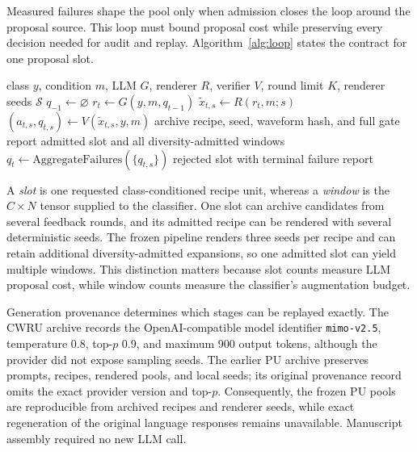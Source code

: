 \documentclass[a4paper,fleqn]{cas-sc}
\newcommand{\breeze}{BREEZE}
\begin{document}
Measured failures shape the pool only when admission closes the loop around the
proposal source. This loop must bound proposal cost while preserving every
decision needed for audit and replay. Algorithm~\ref{alg:loop} states the
contract for one proposal slot.

\begin{algorithm}[t]
\caption{\breeze\ recipe admission for one proposal slot}
\label{alg:loop}
\begin{algorithmic}[1]
\Require class $y$, condition $m$, LLM $G$, renderer $R$, verifier $V$,
round limit $K$, renderer seeds $\mathcal{S}$
\State $q_{-1}\gets\varnothing$
  \State $r_t\gets G(y,m,q_{t-1})$
    \State $\tilde{x}_{t,s}\gets R(r_t,m;s)$
    \State $(a_{t,s},q_{t,s})\gets V(\tilde{x}_{t,s},y,m)$
      \State archive recipe, seed, waveform hash, and full gate report
      \State \Return admitted slot and all diversity-admitted windows
    \EndIf
  \EndFor
  \State $q_t\gets\mathrm{AggregateFailures}(\{q_{t,s}\})$
\EndFor
\State \Return rejected slot with terminal failure report
\end{algorithmic}
\end{algorithm}

A \emph{slot} is one requested class-conditioned recipe unit, whereas a
\emph{window} is the $C\times N$ tensor supplied to the classifier. One slot
can archive candidates from several feedback rounds, and its admitted recipe
can be rendered with several deterministic seeds. The frozen pipeline renders
three seeds per recipe and can retain additional diversity-admitted expansions,
so one admitted slot can yield multiple windows. This distinction matters
because slot counts measure LLM proposal cost, while window counts measure the
classifier's augmentation budget.

Generation provenance determines which stages can be replayed exactly. The
CWRU archive records the OpenAI-compatible model identifier
\texttt{mimo-v2.5}, temperature 0.8, top-$p$ 0.9, and maximum 900 output
tokens, although the provider did not expose sampling seeds. The earlier PU
archive preserves prompts, recipes, rendered pools, and local seeds; its
original provenance record omits the exact provider version and top-$p$.
Consequently, the frozen PU pools are reproducible from archived recipes and
renderer seeds, while exact regeneration of the original language responses
remains unavailable. Manuscript assembly required no new LLM call.
\end{document}

